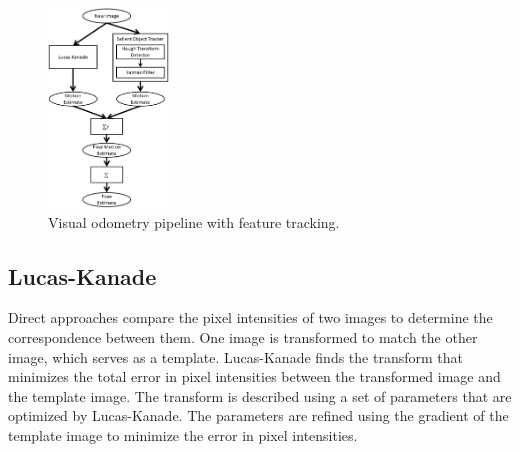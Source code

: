 \documentclass[letterpaper, 10 pt, conference]{ieeeconf}
\begin{document}
%
%
%
%
%


\begin{figure}[tb]
	\centering
	\includegraphics[height=200px]{approach_overview.png}
	\caption{Visual odometry pipeline with feature tracking.}
    \label{approach}
\end{figure}

\subsection{Lucas-Kanade}

Direct approaches compare the pixel intensities of two images to determine the correspondence between them. One image is transformed to match the other image, which serves as a template. Lucas-Kanade finds the transform that minimizes the total error in pixel intensities between the transformed image and the template image. The transform is described using a set of parameters that are optimized by Lucas-Kanade. The parameters are refined using the gradient of the template image to minimize the error in pixel intensities. 
\end{document}
